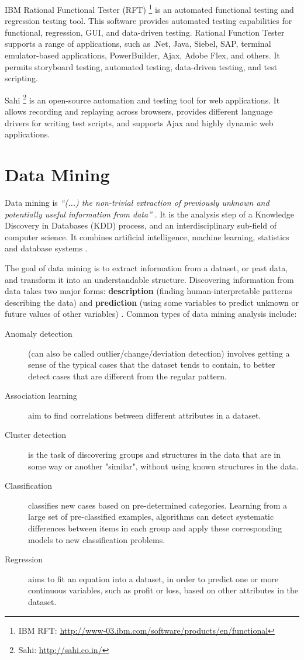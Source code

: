 IBM Rational Functional Tester (RFT) \footnote{IBM RFT: \url{http://www-03.ibm.com/software/products/en/functional}} is an automated functional testing and regression testing tool. This software provides automated testing capabilities for functional, regression, GUI, and data-driven testing. Rational Function Tester supports a range of applications, such as .Net, Java, Siebel, SAP, terminal emulator-based applications, PowerBuilder, Ajax, Adobe Flex, and others. It permits storyboard testing, automated testing, data-driven testing, and test scripting.

Sahi \footnote{Sahi: \url{http://sahi.co.in/}} is an open-source automation and testing tool for web applications. It allows recording and replaying across browsers, provides different language drivers for writing test scripts, and supports Ajax and highly dynamic web applications. 

\section{Data Mining}\label{sec:datamining}

Data mining is \textit{“(...) the non-trivial extraction of previously unknown and potentially useful information from data”} \cite{fayyad1996data}. It is the analysis step of a Knowledge Discovery in Databases (KDD) process, and an interdisciplinary sub-field of computer science. It combines artificial intelligence, machine learning, statistics and database systems \cite{chakrabarti2004data}.

The goal of data mining is to extract information from a dataset, or past data, and transform it into an understandable structure. Discovering information from data takes two major forms: \textbf{description} (finding human-interpretable patterns describing the data) and \textbf{prediction} (using some variables to predict unknown or future values of other variables) \cite{maimon2005data}. Common types of data mining analysis include:
\begin{description}
	\item[Anomaly detection] (can also be called outlier/change/deviation detection) involves getting a sense of the typical cases that the dataset tends to contain, to better detect cases that are different from the regular pattern.
	\item[Association learning] aim to find correlations between different attributes in a dataset.
	\item[Cluster detection] is the task of discovering groups and structures in the data that are in some way or another "similar", without using known structures in the data.
	\item[Classification] classifies new cases based on pre-determined categories. Learning from a large set of pre-classified examples, algorithms can detect systematic differences between items in each group and apply these corresponding models to new classification problems.
	\item[Regression] aims to fit an equation into a dataset, in order to predict one or more continuous variables, such as profit or loss, based on other attributes in the dataset.
\end{description}

